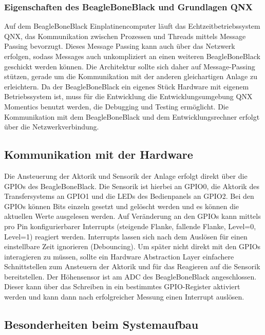 \subsubsection{Eigenschaften des BeagleBoneBlack und Grundlagen QNX}

Auf dem BeagleBoneBlack Einplatinencomputer läuft das Echtzeitbetriebssystem QNX, das Kommunikation zwischen Prozessen und Threads mittels Message Passing bevorzugt.
Dieses Message Passing kann auch über das Netzwerk erfolgen, sodass Messages auch unkompliziert an einen weiteren BeagleBoneBlack geschickt werden können.
Die Architektur sollte sich daher auf Message-Passing stützen, gerade um die Kommunikation mit der anderen gleichartigen Anlage zu erleichtern.
Da der BeagleBoneBlack ein eigenes Stück Hardware mit eigenem Betriebssystem ist, muss für die Entwicklung die Entwicklungsumgebung QNX Momentics benutzt werden, die Debugging und Testing ermöglicht.
Die Kommunikation mit dem BeagleBoneBlack und dem Entwicklungsrechner erfolgt über die Netzwerkverbindung.

\subsection{Kommunikation mit der Hardware}

Die Ansteuerung der Aktorik und Sensorik der Anlage erfolgt direkt über die GPIOs des BeagleBoneBlack.
Die Sensorik ist hierbei an GPIO0, die Aktorik des Transfersystems an GPIO1 und die LEDs des Bedienpanels an GPIO2.
Bei den GPIOs können Bits einzeln gesetzt und gelöscht werden und es können die aktuellen Werte ausgelesen werden.
Auf Veränderung an den GPIOs kann mittels pro Pin konfigurierbarer Interrupts (steigende Flanke, fallende Flanke, Level=0, Level=1) reagiert werden.
Interrupts lassen sich nach dem Auslösen für einen einstellbare Zeit ignorieren (Debouncing).
Um später nicht direkt mit den GPIOs interagieren zu müssen, sollte ein Hardware Abstraction Layer einfachere Schnittstellen zum Ansteuern der Aktorik und für das Reagieren auf die Sensorik bereitstellen.
Der Höhensensor ist am ADC des BeagleBoneBlack angeschlossen. Dieser kann über das Schreiben in ein bestimmtes GPIO-Register aktiviert werden und kann dann nach erfolgreicher Messung einen Interrupt auslösen.

\subsection{Besonderheiten beim Systemaufbau}

